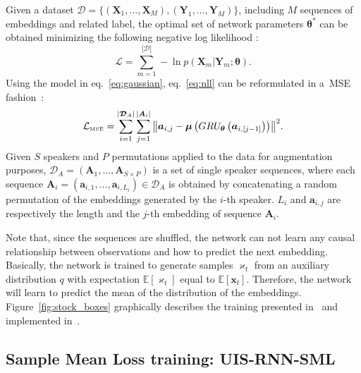 \documentclass{article}
\def\x{{\mathbf x}}
\def\X{{\mathbf X}}
\def\Y{{\mathbf Y}}
\begin{document}
Given a dataset $\boldsymbol{\mathcal{D}} = \{ \left(\boldsymbol{\X}_{1}, \dots, \boldsymbol{\X}_{M} \right), \left(\boldsymbol{\Y}_{1}, \dots, \boldsymbol{\Y}_{M} \right)\}$, including $M$ sequences of embeddings and related label, the optimal set of network parameters $\boldsymbol{\theta}^{*}$ can be obtained minimizing the following negative log likelihood \cite{zhang2019fully}: 
\begin{equation}
    \label{eq:nll}
    \mathcal{L} = \sum_{m=1}^{\left|\boldsymbol{\mathcal{D}}\right|} - \ln{p(\X_m | \Y_m; \boldsymbol{\theta})}.
\end{equation}
Using the model in eq.~\ref{eq:gaussian}, eq.~\ref{eq:nll} can be reformulated in a~\ac{MSE} fashion~\cite{uisrnn-official-library}:
\begin{equation}
\label{eq:networktraining}
    \mathcal{L}_{\mbox{\tiny{MSE}}} =  \sum_{i=1}^{|\boldsymbol{\mathcal{D}}_A|} \sum_{j=1}^{|\boldsymbol{A}_i|}{\left\| \boldsymbol{a}_{i,j} -\boldsymbol{\mu}\left(GRU_{\boldsymbol{\theta}}\left(\boldsymbol{a}_{i,[j-1]}\right)\right) \right\|}^2.
\end{equation}
Given $S$ speakers and $P$ permutations applied to the data for augmentation purposes, $\boldsymbol{\mathcal{D}}_A = \left(\boldsymbol{A}_{1}, \dots, \boldsymbol{A}_{S \times P} \right)$ is a set of single speaker sequences, where each sequence $\boldsymbol{A}_{i} = (\boldsymbol{a}_{i,1}, \dots,\boldsymbol{a}_{i,L_i}) \in \boldsymbol{\mathcal{D}}_A$ is obtained by concatenating a random permutation of the embeddings generated by the $i$-th speaker. $L_i$ and $\boldsymbol{a}_{i,j}$ are respectively the length and the $j$-th embedding of sequence $\boldsymbol{A}_i$. 

Note that, since the sequences are shuffled, the network can not learn any causal relationship between observations and how to predict the next embedding. Basically, the network is trained to generate samples $\boldsymbol{\varkappa}_t$ from an auxiliary distribution $q$ with expectation $\mathbb{E}[\boldsymbol{\varkappa}_t]$ equal to $\mathbb{E}[\x_t]$. Therefore, the network will learn to predict the mean of the distribution of the embeddings.
Figure~\ref{fig:stock_boxes} graphically describes the training presented in~\cite{zhang2019fully} and implemented in~\cite{uisrnn-official-library}.



\subsection{Sample Mean Loss training: UIS-RNN-SML}
\end{document}
